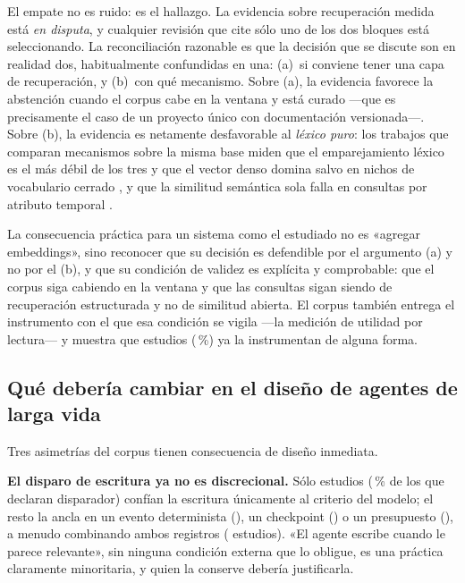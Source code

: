 \documentclass[conference]{IEEEtran}
\begin{document}
El empate no es ruido: es el hallazgo. La evidencia sobre recuperación medida está \emph{en disputa},
y cualquier revisión que cite sólo uno de los dos bloques está seleccionando. La reconciliación
razonable es que la decisión que se discute son en realidad dos, habitualmente confundidas en una:
(a)~si conviene tener una capa de recuperación, y (b)~con qué mecanismo. Sobre (a), la evidencia
favorece la abstención cuando el corpus cabe en la ventana y está curado —que es precisamente el
caso de un proyecto único con documentación versionada—. Sobre (b), la evidencia es netamente
desfavorable al \emph{léxico puro}: los trabajos que comparan mecanismos sobre la misma base miden
que el emparejamiento léxico es el más débil de los tres \cite{cW7133571000} y que el vector denso
domina salvo en nichos de vocabulario cerrado \cite{cW7162893362}, y que la similitud semántica sola
falla en consultas por atributo temporal \cite{cW4399354028}.

La consecuencia práctica para un sistema como el estudiado no es «agregar embeddings», sino
reconocer que su decisión es defendible por el argumento (a) y no por el (b), y que su condición de
validez es explícita y comprobable: que el corpus siga cabiendo en la ventana y que las consultas
sigan siendo de recuperación estructurada y no de similitud abierta. El corpus también entrega el
instrumento con el que esa condición se vigila —la medición de utilidad por lectura— y muestra que
\clRQtresMide{} estudios (\clRQtresMidePct{}\,\%) ya la instrumentan de alguna forma.

\subsection{Qué debería cambiar en el diseño de agentes de larga vida}
\label{sec:disc-implications}

Tres asimetrías del corpus tienen consecuencia de diseño inmediata.

\textbf{El disparo de escritura ya no es discrecional.} Sólo \clRQdosSoloDiscrecional{} estudios
(\clRQdosSoloDiscrecionalPct{}\,\% de los que declaran disparador) confían la escritura únicamente
al criterio del modelo; el resto la ancla en un evento determinista
(\clRQdosTriggerDeterminista{}), un checkpoint (\clRQdosTriggerCheckpoint{}) o un presupuesto
(\clRQdosTriggerPresupuesto{}), a menudo combinando ambos registros
(\clRQdosAmbosTriggers{} estudios). «El agente escribe cuando le parece relevante», sin ninguna
condición externa que lo obligue, es una práctica claramente minoritaria, y quien la conserve
debería justificarla.
\end{document}
